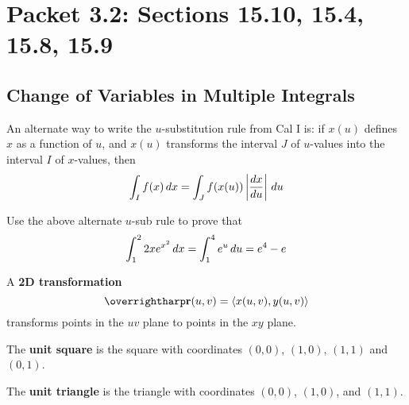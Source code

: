 \documentclass[letterpaper, twoside, 12pt]{book}
\begin{document}
\setcounter{chapter}{2}

\chapter{Packet 3.2: Sections 15.10, 15.4, 15.8, 15.9}

\setcounter{chapter}{15}
\setcounter{section}{9}

\section{Change of Variables in Multiple Integrals} %

\begin{remark}
  An alternate way to write the $u$-substitution rule from Cal I is: if
  $x(u)$ defines $x$ as a function of $u$, and $x(u)$ transforms the interval
  $J$ of $u$-values into the interval $I$ of $x$-values, then
    \[
      \int_I f(x) \,d{x}
        =
      \int_J f(x(u)) \left|\frac{dx}{du}\right|\,d{u}
    \]
\end{remark}

          \begin{problem}
            Use the above alternate $u$-sub rule
            to prove that
              \[
                \int_1^2 2xe^{x^2}\,d{x}
                  =
                \int_1^4 e^u\,d{u}
                  =
                e^4-e
              \]
          \end{problem}

          \begin{solution}

          \end{solution}

          \begin{contributors}

          \end{contributors}

\begin{definition}
  A \textbf{2D transformation}
  \[
    \vect{r}(u,v)
      =
    \<x(u,v),y(u,v)\>
  \]
  transforms points in the $uv$ plane to points in the $xy$ plane.
\end{definition}

\begin{definition}
  The \textbf{unit square} is the square with coordinates
  $(0,0)$, $(1,0)$, $(1,1)$ and $(0,1)$.
\end{definition}

\begin{definition}
  The \textbf{unit triangle} is the triangle with coordinates
  $(0,0)$, $(1,0)$, and $(1,1)$.
\end{definition}
\end{document}
